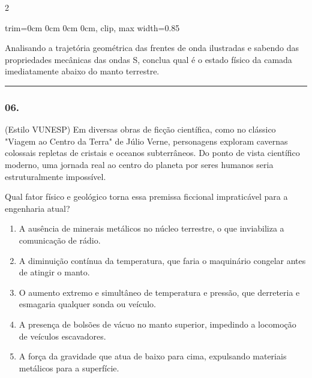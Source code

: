 \documentclass[twoside, 10pt, a4paper]{article}
\newlength{\espacoPreQuestao}
\newlength{\espacoQuestao}
\newlength{\espacoAlt}
\newcommand{\larguraTikz}{0.85\linewidth}
\begin{document}
\begin{multicols*}{2}
\begin{center}
\begin{adjustbox}{trim=0cm 0cm 0cm 0cm, clip, max width=\larguraTikz}
\end{adjustbox}
\end{center}

Analisando a trajetória geométrica das frentes de onda ilustradas e sabendo das propriedades mecânicas das ondas S, conclua qual é o estado físico da camada imediatamente abaixo do manto terrestre.
\par\vspace{\espacoQuestao}

\noindent\textcolor{CorLinha}{\rule{\linewidth}{0.5pt}} 
\par\vspace{\espacoPreQuestao}
\subsubsection*{06.} (Estilo VUNESP) Em diversas obras de ficção científica, como no clássico "Viagem ao Centro da Terra" de Júlio Verne, personagens exploram cavernas colossais repletas de cristais e oceanos subterrâneos. Do ponto de vista científico moderno, uma jornada real ao centro do planeta por seres humanos seria estruturalmente impossível. 

Qual fator físico e geológico torna essa premissa ficcional impraticável para a engenharia atual?

\begin{enumerate}[label=\alph*), itemsep=\espacoAlt]
\item A ausência de minerais metálicos no núcleo terrestre, o que inviabiliza a comunicação de rádio.
\item A diminuição contínua da temperatura, que faria o maquinário congelar antes de atingir o manto.
\item O aumento extremo e simultâneo de temperatura e pressão, que derreteria e esmagaria qualquer sonda ou veículo.
\item A presença de bolsões de vácuo no manto superior, impedindo a locomoção de veículos escavadores.
\item A força da gravidade que atua de baixo para cima, expulsando materiais metálicos para a superfície.
\end{enumerate}
\par\vspace{\espacoQuestao}


\end{multicols*}
\end{document}

